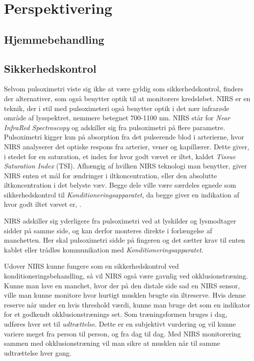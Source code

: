 \chapter{Perspektivering} 

\section{Hjemmebehandling}\label{title:Hjemmebehandling}



\section{Sikkerhedskontrol}\label{title:nirs}
Selvom pulsoximetri viste sig ikke at være gyldig som sikkerhedskontrol, finders der alternativer, som også benytter optik til at monitorere kredsløbet. NIRS er en teknik, der i stil med pulsoximeteri også benytter optik i det nær infrarøde område af lysspektret, nemmere betegnet 700-1100 nm. NIRS står for \textit{Near InfraRed Spectroscopy} og adskiller sig fra pulsoximetri på flere parametre. Pulsoximetri kigger kun på absorption fra det pulserende blod i arterierne, hvor NIRS analyserer det optiske respons fra arterier, vener og kapillærer. Dette giver, i stedet for en saturation, et index for hvor godt vævet er iltet, kaldet \textit{Tissue Saturation Index} (TSI). Afhængig af hvilken NIRS teknologi man benytter, giver NIRS enten et mål for ændringer i iltkoncentration, eller den absolutte iltkoncentration i det belyste væv. Begge dele ville være særdeles egnede som sikkerhedskontrol til \textit{Konditioneringsapparatet}, da begge giver en indikation af hvor godt iltet vævet er, \cite{RefWorks:22} .

NIRS adskiller sig yderligere fra pulsoximetri ved at lyskilder og lysmodtager sidder på samme side, og kan derfor monteres direkte i forlængelse af manchetten. Her skal pulsoximetri sidde på fingeren og det sætter krav til enten kablet eller trådløs kommunikation med \textit{Konditioneringsapparatet}. 

Udover NIRS kunne fungere som en sikkerhedskontrol ved konditioneringsbehandling, så vil NIRS også være gavnlig ved okklusionstræning. Kunne man lave en manchet, hvor der på den distale side sad en NIRS sensor, ville man kunne monitore hvor hurtigt musklen brugte sin iltreserve. Hvis denne reserve når under en hvis threshold værdi, kunne man bruge det som en indikator for et godkendt okklusionstrænings set. Som træningsformen bruges i dag, udføres hver set til \textit{udtrættelse}. Dette er en subjektivt vurdering og vil kunne variere meget fra person til person, og fra dag til dag. Med NIRS monitorering sammen med okklusionstræning vil man sikre at musklen når til samme udtrættelse hver gang. 

